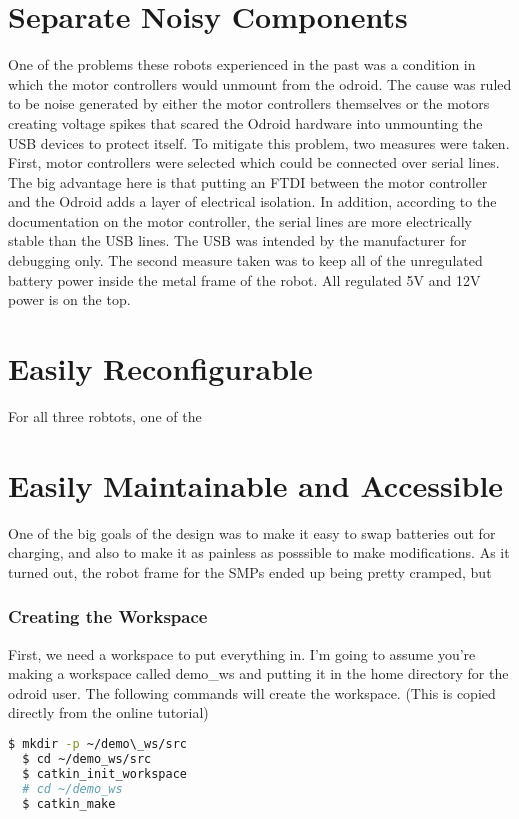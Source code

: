 \section{Separate Noisy Components}

One of the problems these robots experienced in the past was a condition in which the motor controllers would unmount from the odroid. The cause was ruled to be noise generated by either the motor controllers themselves or the motors creating voltage spikes that scared the Odroid hardware into unmounting the USB devices to protect itself. To mitigate this problem, two measures were taken. First, motor controllers were selected which could be connected over serial lines. The big advantage here is that putting an FTDI between the motor controller and the Odroid adds a layer of electrical isolation. In addition, according to the documentation on the motor controller, the serial lines are more electrically stable than the USB lines. The USB was intended by the manufacturer for debugging only. The second measure taken was to keep all of the unregulated battery power inside the metal frame of the robot. All regulated 5V and 12V power is on the top.

\section{Easily Reconfigurable}

For all three robtots, one of the 

\section{Easily Maintainable and Accessible}

One of the big goals of the design was to make it easy to swap batteries out for charging, and also to make it as painless as posssible to make modifications. As it turned out, the robot frame for the SMPs ended up being pretty cramped, but 
\subsubsection{Creating the Workspace}

First, we need a workspace to put everything in. I'm going to assume you're making a workspace called demo\_ws and putting it in the home directory for the odroid user. The following commands will create the workspace. (This is copied directly from the online tutorial)

\begin{lstlisting}[language=bash]
  $ mkdir -p ~/demo\_ws/src
  $ cd ~/demo_ws/src
  $ catkin_init_workspace
  # cd ~/demo_ws
  $ catkin_make
\end{lstlisting}

